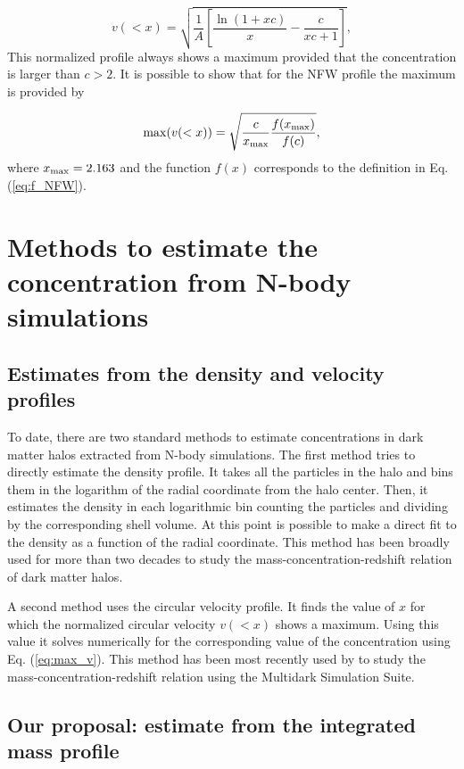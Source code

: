 \documentclass[a4,useAMS,usenatbib,usegraphicx]{mn2e}
\begin{document}
\begin{equation}
v(<x)=\sqrt{\frac{1}{A}\left[\frac{\ln\left(1+xc\right)}{x}-\frac{c}{xc+1}\right]},
\end{equation}
%
This normalized profile always shows a maximum provided that the
concentration is larger than $c>2$.
It is possible to show that for the NFW profile the maximum is
provided by

\begin{equation}
\mathrm{max}(v(<x)) = \sqrt{\frac{c}{x_{\rm max}}\frac{f(x_{\rm
      max})}{f(c)}},
\label{eq:max_v}
\end{equation}
where $x_{\rm max}=2.163$ \citep{Klypin2014} and the function $f(x)$
corresponds to the definition in Eq. (\ref{eq:f_NFW}).

\section{Methods to estimate the concentration from N-body simulations}
\label{sec:method}

\subsection{Estimates from the density and velocity profiles}

To date, there are two standard methods to estimate concentrations in
dark matter halos extracted from N-body simulations. 
The first method tries to directly estimate the density profile.  
It takes all the particles in the halo and bins them in the logarithm of
the radial coordinate from the halo center.  
Then, it estimates the density in each logarithmic bin counting the
particles and dividing by the corresponding shell volume.  
At this point is possible to make a direct fit to the density as a
function of the radial coordinate. 
This method has been broadly used for more than two decades to study
the mass-concentration-redshift relation of dark matter halos.
 
A second method uses the circular velocity profile.  
It finds the value of $x$ for which the normalized circular velocity
$v(<x)$ shows a maximum.  
Using this value it solves numerically for the corresponding value of
the concentration using Eq. (\ref{eq:max_v}). 
This method has been most recently used by \cite{Klypin2014} to study
the mass-concentration-redshift relation using the Multidark
Simulation Suite. 


\subsection{Our proposal: estimate from the integrated mass profile}
\end{document}
